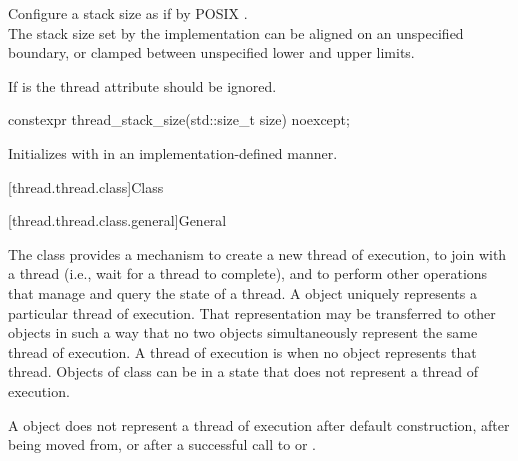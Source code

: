 \documentclass{wg21}
\begin{document}
\begin{addedblock}
\recommended
Configure a stack size as if by POSIX \mbox{}.\\
The stack size set by the implementation
can be aligned on an unspecified boundary, or clamped between unspecified lower and upper limits.

If  is  the thread attribute should be ignored.


\begin{itemdecl}
constexpr thread_stack_size(std::size_t size) noexcept;
\end{itemdecl}

\begin{itemdescr}
\effects Initializes  with  in an implementation-defined manner.
\end{itemdescr}

\end{addedblock}

[thread.thread.class]{Class }

[thread.thread.class.general]{General}

\pnum
The class  provides a mechanism to create a new thread of execution, to join with
a thread (i.e., wait for a thread to complete), and to perform other operations that manage and
query the state of a thread. A  object uniquely represents a particular thread of
execution. That representation may be transferred to other  objects in such a way
that no two  objects simultaneously represent the same thread of execution. A
thread of execution is  when no  object represents that thread.
Objects of class  can be in a state that does not represent a thread of
execution.
\begin{note}
    A  object does not represent a thread of execution after
    default construction, after being moved from, or after a successful call to  or
    .
\end{note}
\end{document}
